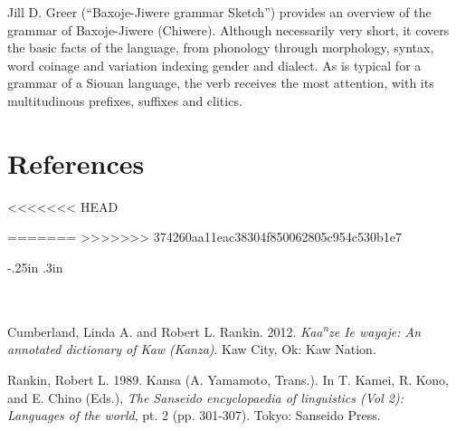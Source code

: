 \begin{refsection}
Jill D. Greer (``Baxoje-Jiwere grammar Sketch'') provides an overview of the grammar of Baxoje-Jiwere (Chiwere). Although necessarily very short, it covers the basic facts of the language, from phonology through morphology, syntax, word coinage and variation indexing gender and dialect. As is typical for a grammar of a Siouan language, the verb receives the most attention, with its multitudinous prefixes, suffixes and clitics. 

\section*{References}

<<<<<<< HEAD

\printbibliography[heading=subbibliography,notkeyword=this]
=======
\newenvironment{reflist} {\begin{list} {} {\listparindent -.25in
\leftmargin .3in} \item \ \vspace{-.3in} } {\end{list} }
>>>>>>> 374260aa11eac38304f850062805c954c530b1e7

\begin{reflist}

Cumberland, Linda A. and Robert L. Rankin. 2012. \textit{Kaa\textsuperscript{n}ze Ie wayaje: An annotated dictionary of Kaw (Kanza)}. Kaw City, Ok: Kaw Nation.

Rankin, Robert L. 1989. Kansa (A. Yamamoto, Trans.). In T. Kamei, R. Kono, and E. Chino (Eds.), \textit{The Sanseido encyclopaedia of linguistics (Vol 2): Languages of the world}, pt. 2 (pp. 301-307). Tokyo: Sanseido Press.

\end{reflist}
\end{refsection}

